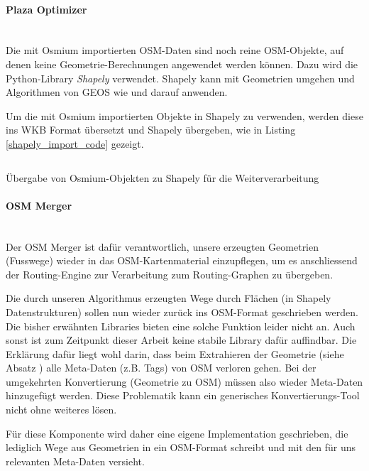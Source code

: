 \paragraph{Plaza Optimizer}\label{par:Plaza Optimizer}~\\
Die mit Osmium importierten \ac{OSM}-Daten sind noch reine \ac{OSM}-Objekte, auf denen keine Geometrie-Berechnungen angewendet werden können. Dazu wird die Python-Library \emph{Shapely}\cite{shapely} verwendet. Shapely kann mit Geometrien umgehen und Algorithmen von \ac{GEOS} wie  und  darauf anwenden.

Um die mit Osmium importierten Objekte in Shapely zu verwenden, werden diese ins \ac{WKB} Format übersetzt und Shapely übergeben, wie in Listing \ref{shapely_import_code} gezeigt.

\begin{listing}[ht]
    \inputminted{python}{projectdoc/listing/shapely_import.py}
    \caption[Einlesen OSM Objekte in Shapely]{Übergabe von Osmium-Objekten zu Shapely für die Weiterverarbeitung}
    \label{shapely_import_code}
\end{listing}



\paragraph{OSM Merger}\label{par:OSM Merger}~\\
Der OSM Merger ist dafür verantwortlich, unsere erzeugten Geometrien (Fusswege) wieder in das \ac{OSM}-Kartenmaterial einzupflegen, um es anschliessend der Routing-Engine zur Verarbeitung zum Routing-Graphen zu übergeben.

Die durch unseren Algorithmus erzeugten Wege durch Flächen (in Shapely Datenstrukturen) sollen nun wieder zurück ins \ac{OSM}-Format geschrieben werden. Die bisher erwähnten Libraries bieten eine solche Funktion leider nicht an. Auch sonst ist zum Zeitpunkt dieser Arbeit keine stabile Library dafür auffindbar. Die Erklärung dafür liegt wohl darin, dass beim Extrahieren der Geometrie (siehe Absatz ) alle Meta-Daten (z.B. Tags) von \ac{OSM} verloren gehen. Bei der umgekehrten Konvertierung (Geometrie zu \ac{OSM}) müssen also wieder Meta-Daten hinzugefügt werden. Diese Problematik kann ein generisches Konvertierungs-Tool nicht ohne weiteres lösen.

Für diese Komponente wird daher eine eigene Implementation geschrieben, die lediglich Wege aus Geometrien in ein \ac{OSM}-Format schreibt und mit den für uns relevanten Meta-Daten versieht.

